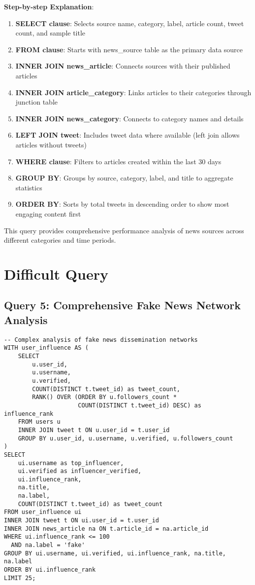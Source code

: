 \documentclass[12pt,a4paper]{report}
\begin{document}
\textbf{Step-by-step Explanation}:
\begin{enumerate}
    \item \textbf{SELECT clause}: Selects source name, category, label, article count, tweet count, and sample title
    \item \textbf{FROM clause}: Starts with news\_source table as the primary data source
    \item \textbf{INNER JOIN news\_article}: Connects sources with their published articles
    \item \textbf{INNER JOIN article\_category}: Links articles to their categories through junction table
    \item \textbf{INNER JOIN news\_category}: Connects to category names and details
    \item \textbf{LEFT JOIN tweet}: Includes tweet data where available (left join allows articles without tweets)
    \item \textbf{WHERE clause}: Filters to articles created within the last 30 days
    \item \textbf{GROUP BY}: Groups by source, category, label, and title to aggregate statistics
    \item \textbf{ORDER BY}: Sorts by total tweets in descending order to show most engaging content first
\end{enumerate}
This query provides comprehensive performance analysis of news sources across different categories and time periods.

\section{Difficult Query}

\subsection{Query 5: Comprehensive Fake News Network Analysis}
\begin{lstlisting}[caption={Difficult Query}]
-- Complex analysis of fake news dissemination networks
WITH user_influence AS (
    SELECT 
        u.user_id,
        u.username,
        u.verified,
        COUNT(DISTINCT t.tweet_id) as tweet_count,
        RANK() OVER (ORDER BY u.followers_count * 
                     COUNT(DISTINCT t.tweet_id) DESC) as influence_rank
    FROM users u
    INNER JOIN tweet t ON u.user_id = t.user_id
    GROUP BY u.user_id, u.username, u.verified, u.followers_count
)
SELECT 
    ui.username as top_influencer,
    ui.verified as influencer_verified,
    ui.influence_rank,
    na.title,
    na.label,
    COUNT(DISTINCT t.tweet_id) as tweet_count
FROM user_influence ui
INNER JOIN tweet t ON ui.user_id = t.user_id
INNER JOIN news_article na ON t.article_id = na.article_id
WHERE ui.influence_rank <= 100
  AND na.label = 'fake'
GROUP BY ui.username, ui.verified, ui.influence_rank, na.title, na.label
ORDER BY ui.influence_rank
LIMIT 25;
\end{lstlisting}
\end{document}

